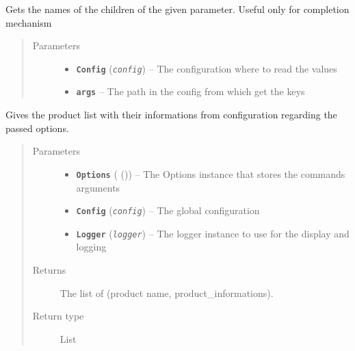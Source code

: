 \documentclass[a4paper,10pt,english]{sphinxmanual}
\begin{document}
\begin{fulllineitems}
\label{commands/apidoc/src:src.configManager.get_config_children}
Gets the names of the children of the given parameter.
Useful only for completion mechanism
\begin{quote}\begin{description}
\item[{Parameters}] \leavevmode\begin{itemize}
\item {} 
\textbf{\texttt{Config}} (\emph{\texttt{config}}) -- The configuration where to read the values

\item {} 
\textbf{\texttt{args}} -- The path in the config from which get the keys

\end{itemize}

\end{description}\end{quote}

\end{fulllineitems}


\begin{fulllineitems}
\label{commands/apidoc/src:src.configManager.get_products_list}
Gives the product list with their informations from 
configuration regarding the passed options.
\begin{quote}\begin{description}
\item[{Parameters}] \leavevmode\begin{itemize}
\item {} 
\textbf{\texttt{Options}} ({\hyperref[commands/apidoc/src:module\string-src.options]{}} ()) -- The Options instance that stores the commands arguments

\item {} 
\textbf{\texttt{Config}} (\emph{\texttt{config}}) -- The global configuration

\item {} 
\textbf{\texttt{Logger}} (\emph{\texttt{logger}}) -- The logger instance to use for the display and logging

\end{itemize}

\item[{Returns}] \leavevmode
The list of (product name, product\_informations).

\item[{Return type}] \leavevmode
List

\end{description}\end{quote}

\end{fulllineitems}
\end{document}
